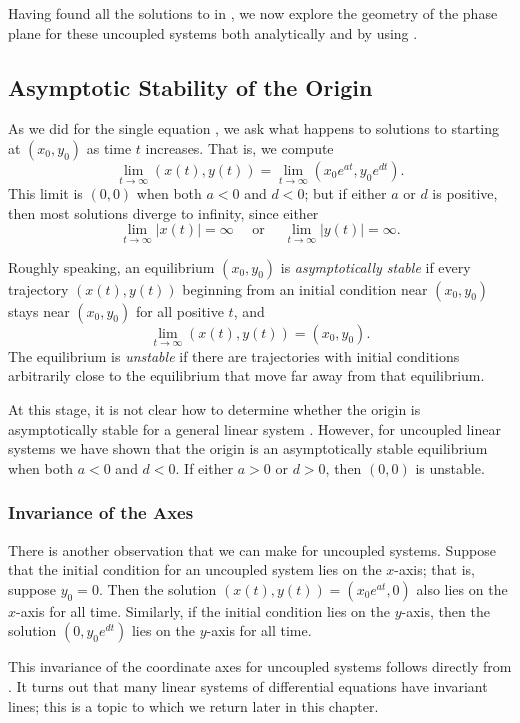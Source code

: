Having found all the solutions to  in ,
we now explore the geometry of the phase plane for
these uncoupled systems both analytically and by using \Matlabp.


\subsection*{Asymptotic Stability of the Origin}

As we did for the single equation , we ask
what happens to solutions to  starting at $(x_0,y_0)$ as
time $t$ increases.  That is, we compute
\[
\lim_{t\to\infty}(x(t),y(t))=\lim_{t\to\infty}(x_0e^{a t},y_0e^{d t}).
\]
This limit is $(0,0)$ when both $a<0$ and $d<0$; but
if either $a$ or $d$ is positive, then most solutions diverge
to infinity, since either
\[
\lim_{t\to\infty}|x(t)| =\infty \quad \mbox{ or } \quad
\lim_{t\to\infty}|y(t)| =\infty.
\]


Roughly speaking, an equilibrium  $(x_0,y_0)$ is 
{\em asymptotically stable\/}  if every 
trajectory $(x(t),y(t))$ beginning from an initial condition near 
$(x_0,y_0)$ stays near $(x_0,y_0)$ for all positive $t$, and
\[
\lim_{t\to\infty}(x(t),y(t)) = (x_0,y_0).
\]
The equilibrium is {\em unstable\/}  if there are  
trajectories with initial conditions arbitrarily close to the 
equilibrium that move far away from that equilibrium.

At this stage, it is not clear how to determine whether the
origin is asymptotically stable for a general linear system
.  However, for uncoupled linear systems we
have shown that the origin is an asymptotically stable
equilibrium when both $a < 0$ and $d < 0$.  If either
$a >0$ or $d > 0$, then $(0,0)$ is unstable.

\subsubsection*{Invariance of the Axes}

There is another observation that we can make
for uncoupled systems.  Suppose that the initial condition for
an uncoupled system lies on the $x$-axis; that is, suppose $y_0=0$.
Then the solution $(x(t),y(t))=(x_0e^{at},0)$ also lies on the
$x$-axis for all time.  Similarly, if the initial condition lies
on the $y$-axis, then the solution $(0,y_0e^{dt})$ lies on the
$y$-axis for all time.

This invariance of the coordinate axes for uncoupled systems
follows directly from .  It turns out that
many linear systems of differential equations have invariant
lines; this is a topic to which we return later in this chapter.

